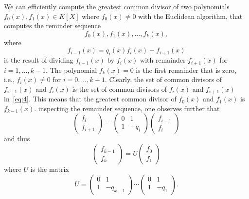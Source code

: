 We can efficiently compute the greatest common divisor of two polynomials $f_0(x), f_1(x) ∈ K[X]$ where $f_0(x) ≠0$   with the Euclidean algorithm, that computes the reminder sequence
\begin{displaymath}
  f_0(x),f_1(x),\dots,f_k(x), 
\end{displaymath}
where
\begin{equation}
  \label{eq:4}
  f_{i-1}(x) = q_i(x) f_i(x) + f_{i+1}(x)
\end{equation}
is the result of dividing $f_{i-1}(x)$    by $f_i(x)$ with remainder $f_{i+1}(x)$ for $i=1,\dots,k-1$. The polynomial $f_k(x) = 0$ is the first remainder that is zero, i.e.,  $f_i(x) ≠0$ for $i=0,\dots,k-1$. Clearly, the set of common divisors of $f_{i-1}(x)$ and $f_i(x)$  is the set of common divisors of $f_{i}(x)$ and $f_{i+1}(x)$ in~\eqref{eq:4}. This means that the greatest common divisor of $f_0(x)$ and $f_1(x)$ is $f_{k-1}(x)$. inspecting the remainder sequence, one observes further that
\begin{equation}
  \label{eq:5}
  \begin{pmatrix}
    f_{i} \\
    f_{i+1}
  \end{pmatrix}
  =
  \begin{pmatrix}
    0 & 1 \\
    1 & -q_i
  \end{pmatrix}
  \begin{pmatrix}
    f_{i-1}  \\
    f_{i}
  \end{pmatrix}
\end{equation}
and thus
\begin{equation}
  \label{eq:6}
   \begin{pmatrix}
    f_{k-1} \\
    f_{k}
  \end{pmatrix}
  =
  U 
  \begin{pmatrix}
    f_0  \\
    f_1
  \end{pmatrix}
\end{equation}
where
$
U 
  $
  is the matrix 
\begin{equation}
  \label{eq:7} U =    
  \begin{pmatrix}
    0 & 1 \\
    1 & -q_{k-1}
  \end{pmatrix} \cdots
  \begin{pmatrix}
    0 & 1 \\
    1 & -q_{1}
  \end{pmatrix}. 
\end{equation}



